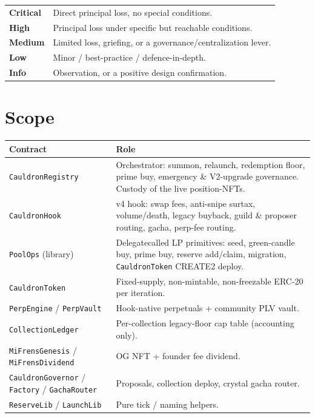 \documentclass[11pt]{article}
\newcommand{\sev}[2]{\textcolor{#1}{\textbf{#2}}}
\begin{document}
\begin{center}\small
\begin{tabular}{ll}
\toprule
\sev{sevCrit}{Critical} & Direct principal loss, no special conditions.\\
\sev{sevHigh}{High}     & Principal loss under specific but reachable conditions.\\
\sev{sevMed}{Medium}    & Limited loss, griefing, or a governance/centralization lever.\\
\sev{sevLow}{Low}       & Minor / best-practice / defence-in-depth.\\
\sev{sevInfo}{Info}     & Observation, or a positive design confirmation.\\
\bottomrule
\end{tabular}
\end{center}

\section{Scope}

\begin{center}\small
\begin{longtable}{p{}p{}}
\toprule
\textbf{Contract} & \textbf{Role}\\
\midrule
\endhead
\texttt{CauldronRegistry} & Orchestrator: summon, relaunch, redemption floor, prime buy,
  emergency \& V2-upgrade governance. Custody of the live position-NFTs.\\
\texttt{CauldronHook} & v4 hook: swap fees, anti-snipe surtax, volume/death, legacy
  buyback, guild \& proposer routing, gacha, perp-fee routing.\\
\texttt{PoolOps} (library) & Delegatecalled LP primitives: seed, green-candle buy,
  prime buy, reserve add/claim, migration, \texttt{CauldronToken} CREATE2 deploy.\\
\texttt{CauldronToken} & Fixed-supply, non-mintable, non-freezable ERC-20 per iteration.\\
\texttt{PerpEngine} / \texttt{PerpVault} & Hook-native perpetuals + community PLV vault.\\
\texttt{CollectionLedger} & Per-collection legacy-floor cap table (accounting only).\\
\texttt{MiFrensGenesis} / \texttt{MiFrensDividend} & OG NFT + founder fee dividend.\\
\texttt{CauldronGovernor} / \texttt{Factory} / \texttt{GachaRouter} & Proposals,
  collection deploy, crystal gacha router.\\
\texttt{ReserveLib} / \texttt{LaunchLib} & Pure tick / naming helpers.\\
\bottomrule
\end{longtable}
\end{center}
\end{document}
